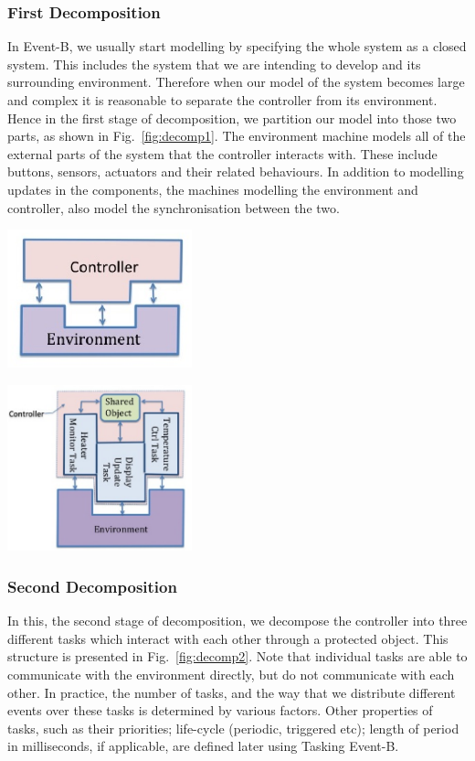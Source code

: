 \subsubsection{First Decomposition}
%
In Event-B, we usually start modelling by specifying the whole system as a closed system. This includes the system that we are intending to develop and its surrounding environment. Therefore when our model of the system becomes large and complex it is reasonable to separate the controller from its environment. Hence in the first stage of decomposition, we partition our model into those two parts, as shown in Fig.~\ref{fig:decomp1}. The environment machine models all of the external parts of the system that the controller interacts with. These include buttons, sensors, actuators and their related behaviours. In addition to modelling updates in the components, the machines modelling the environment and controller, also model the synchronisation between the two.
%
\begin{multicols}{2}
\begin{figurehere}
	\centering
		\includegraphics[width=0.4\textwidth]{pictures/decomp1.eps}
	\caption{Decomposition - Stage 1}
	\label{fig:decomp1}
\end{figurehere}

\begin{figurehere}
	\centering
		\includegraphics[width=0.4\textwidth]{pictures/decomp2.eps}
	\caption{Decomposition - Stage 2}
	\label{fig:decomp2}
\end{figurehere}
\end{multicols}
%
\subsubsection{Second Decomposition}
%
In this, the second stage of decomposition, we decompose the controller into three different tasks which interact with each other through a protected object. This structure is presented in Fig.~\ref{fig:decomp2}.
%
Note that individual tasks are able to communicate with the environment directly, but do not communicate with each other. In practice, the number of tasks, and the way that we distribute different events over these tasks is determined by various factors. Other properties of tasks, such as their priorities; life-cycle (periodic, triggered etc); length of period in milliseconds, if applicable, are defined later using Tasking Event-B.
%
